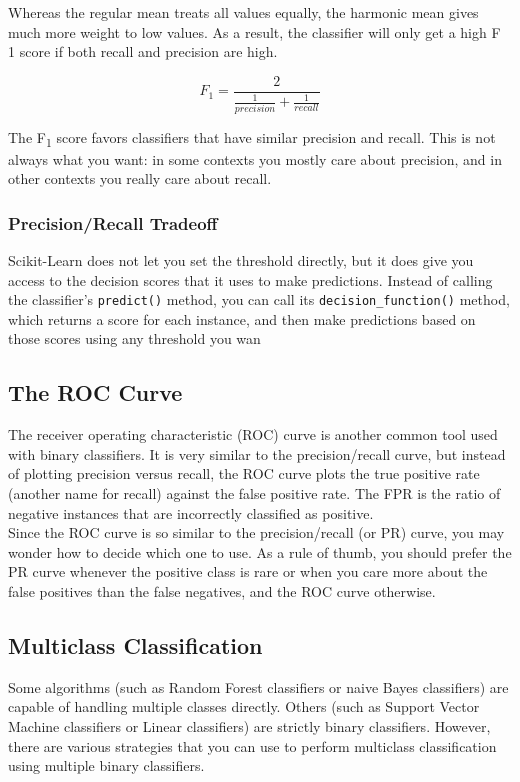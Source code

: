 \documentclass[french]{article}
\begin{document}
Whereas the regular mean treats all values equally, the harmonic mean gives much more weight to low values.  As a result, the classifier will only get a high F 1 score if both recall and precision are high.

\[F_1 = \frac{2}{\frac{1}{precision} + \frac{1}{recall}}\]

The F\textsubscript{1} score favors classifiers that have similar precision and recall. This is not always what you want: in some contexts you mostly care about precision, and in other contexts you really care about recall.

\subsubsection{Precision/Recall Tradeoff}

Scikit-Learn does not let you set the threshold directly, but it does give you access to the decision scores that it uses to make predictions. Instead of calling the classifier’s \lstinline{predict()} method, you can call its \lstinline{decision_function()} method, which returns a score for each instance, and then make predictions based on those scores using any threshold you wan

\subsection{The ROC Curve}

The receiver operating characteristic (ROC) curve is another common tool used with binary classifiers. It is very similar to the precision/recall curve, but instead of plotting precision versus recall, the ROC curve plots the true positive rate (another name for recall) against the false positive rate. The FPR is the ratio of negative instances that are incorrectly classified as positive.\\

Since the ROC curve is so similar to the precision/recall (or PR) curve, you may wonder how to decide which one to use. As a rule of thumb, you should prefer the PR curve whenever the positive class is rare or when you care more about the false positives than the false negatives, and the ROC curve otherwise.

\subsection{Multiclass Classification}

Some algorithms (such as Random Forest classifiers or naive Bayes classifiers) are capable of handling multiple classes directly. Others (such as Support Vector Machine classifiers or Linear classifiers) are strictly binary classifiers. However, there are various strategies that you can use to perform multiclass classification using multiple binary classifiers.
\end{document}

